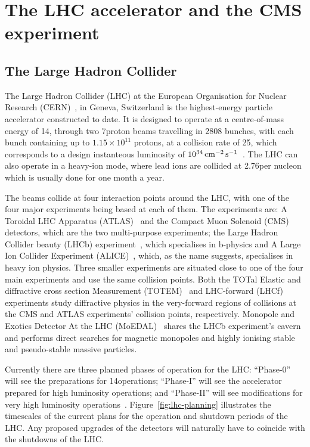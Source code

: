 \chapter{The LHC accelerator and the CMS experiment}\label{chapter:lhc-cms}
\section{The Large Hadron Collider}\label{sec:lhc}

The Large Hadron Collider (LHC) at the European Organisation for Nuclear Research (CERN)~\cite{Bruning:782076}, in Geneva, Switzerland is the highest-energy particle accelerator constructed to date. 
It is designed to operate at a centre-of-mass energy of 14\TeV, through two 7\TeV proton beams travelling in 2808 bunches, with each bunch containing up to $1.15 \times 10^{11}$ protons, at a collision rate of 25\ns, which corresponds to a design instanteous luminosity of $10^{34}\,\text{cm}^\text{$-$2}\,\text{s}^\text{$-$1}$~\cite{Bayatian:2006zz}. 
The LHC can also operate in a heavy-ion mode, where lead ions are collided at 2.76\TeV per nucleon which  is usually done for one month a year.

The beams collide at four interaction points around the LHC, with one of the four major experiments being based at each of them. 
The experiments are: A Toroidal LHC Apparatus (ATLAS)~\cite{Aad:2008zzm} and the Compact Muon Solenoid (CMS)~\cite{oldcms} detectors, which are the two multi-purpose experiments; the Large Hadron Collider beauty (LHCb) experiment~\cite{Alves:2008zz}, which specialises in b-physics and A Large Ion Collider Experiment (ALICE)~\cite{Aamodt:2008zz}, which, as the name suggests, specialises in heavy ion physics.
Three smaller experiments are situated close to one of the four main experiments and use the same collision points.
Both the TOTal Elastic and diffractive cross section Measurement (TOTEM)~\cite{Anelli:2008zza} and LHC-forward (LHCf)~\cite{Adriani:2008zz} experiments study diffractive physics in the very-forward regions of collisions at the CMS and ATLAS experiments' collision points, respectively.
Monopole and Exotics Detector At the LHC (MoEDAL)~\cite{Pinfold:2009oia} shares the LHCb experiment's cavern and performs direct searches for magnetic monopoles and highly ionising stable and pseudo-stable massive particles.

Currently there are three planned phases of operation for the LHC: ``Phase-0'' will see the preparations for 14\TeV operations; ``Phase-I'' will see the accelerator prepared for high luminosity operations; and ``Phase-II'' will see modifications for very high luminosity operations~\cite{ECFA}. 
Figure~\ref{fig:lhc-planning} illustrates the timescales of the current plans for the operation and shutdown periods of the LHC.
Any proposed upgrades of the detectors will naturally have to coincide with the shutdowns of the LHC.

